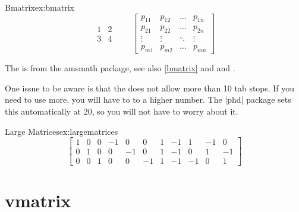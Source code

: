 \begin{texexample}{Bmatrix}{ex:bmatrix}
\begin{equation}
\begin{matrix}
1 & 2 \\
3 & 4
\end{matrix} \qquad
\begin{bmatrix}
p_{11} & p_{12} & \ldots & p_{1n} \\
p_{21} & p_{22} & \ldots & p_{2n} \\
\vdots & \vdots & \ddots & \vdots \\
p_{m1} & p_{m2} & \ldots & p_{mn}
\end{bmatrix}
\end{equation}
\end{texexample}

The  is from the amsmath package, see also \vref{bmatrix} and  and \pageref{bmatrix}. 


One issue to be aware is that the  does not allow more than 10 tab stops. If you need to use more, you will have to  to a higher number. The |phd| package sets this automatically at 20, so you will not have to worry about it.

\begin{teX}
\setcounter{MaxMatrixCols}{20}
\end{teX}

\begin{texexample}{Large Matrices}{ex:largematrices}
\[
\begin{bmatrix}
1 & 0 & 0 & -1 & 0  & 0  & 1 & -1 & 1  & -1 & 0 \\
0 & 1 & 0 & 0  & -1 & 0  & 1 & -1 & 0  & 1  & -1 \\
0 & 0 & 1 & 0  & 0  & -1 & 1 & -1 & -1 & 0  & 1 
\end{bmatrix}
\]
\end{texexample}



\section{vmatrix}

